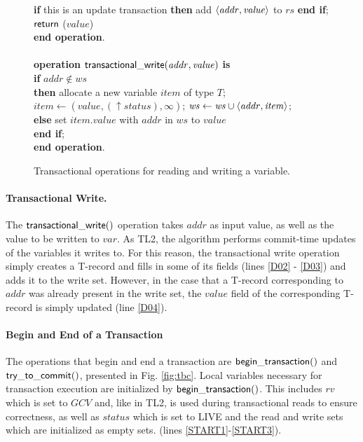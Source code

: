 \begin{figure} [htb]
{{\begin{minipage}[t]{1\linewidth}
\begin{tabbing}
 \> {\bf if} this is an update transaction 
                        {\bf then} add $\left \langle \mathit{addr,value} \right \rangle $ to $\mathit{rs}$ {\bf end if}; \\
 \> ${\sf return}$ ($\mathit{value}$) \\
{\bf end operation}. \\
\\
{\bf operation}  ${\sf transactional\_write}(\mathit{addr, value})$ {\bf is}\\
 \> {\bf if} $\mathit{addr} \not\in \mathit{ws}$  \\
 \>\> {\bf then} \> allocate a new variable $item$ of type $T$; \\
 \>\>\> $\mathit{item}  \gets (\mathit{value, (\uparrow status), \infty})$; 
                   $\mathit{ws} \gets \mathit{ws} \cup \left \langle \mathit{addr, item} \right \rangle $; \\
 \>\> {\bf else} \> set $\mathit{item.value}$ with $\mathit{addr}$ in $\mathit{ws}$ to $\mathit{value}$ \\
 \> {\bf end if}; \\
{\bf end operation}.
\end{tabbing}
\normalsize
\end{minipage}
}
\caption{Transactional operations for reading and writing a variable.}
\label{fig:tops}
}
\end{figure}

\paragraph{Transactional Write.}
The ${\sf transactional\_write()}$ operation
takes $\mathit{addr}$ as input value, as well as the value 
to be written to $\mathit{var}$. As  TL2, the algorithm 
performs commit-time updates of the variables it writes to. 
For this reason, the transactional write  
operation simply creates a T-record and fills in some of its 
fields (lines \ref{D02} - \ref{D03}) and 
adds it to the write set.
However, in the case that a T-record corresponding to $\mathit{addr}$  was
already present in  the write set, the
$\mathit{value}$ field of the corresponding  
T-record is simply updated (line \ref{D04}).


\paragraph{Begin and End of a Transaction} 
The operations that begin and end a transaction are ${\sf begin\_transaction()}$ 
and ${\sf try\_to\_commit()}$, presented in Fig. \ref{fig:tbc}. 
Local variables necessary for transaction execution are initialized by  ${\sf begin\_transaction()}$.
This includes $\mathit{rv}$
which is set to $\mathit{GCV}$ and, like in TL2, is used during transactional
reads to ensure correctness, 
as well as $\mathit{status}$ which is set to LIVE and the read and write sets
which are initialized as empty sets.
(lines \ref{START1}-\ref{START3}). 

